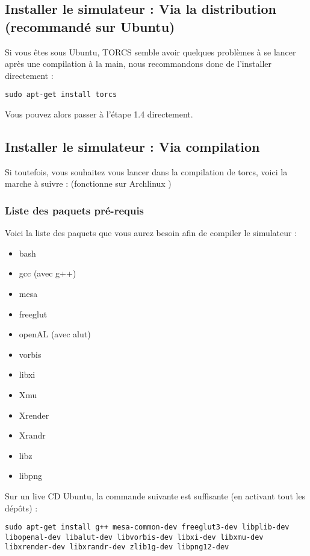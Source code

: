 \documentclass[a4paper,12pt]{article}
\begin{document}
  \subsection{Installer le simulateur : Via la distribution (recommandé sur Ubuntu) }
  
  Si vous êtes sous Ubuntu, TORCS semble avoir quelques problèmes à se lancer après une compilation à la main,
  nous recommandons donc de l'installer directement :
  
    \begin{lstlisting}
sudo apt-get install torcs
    \end{lstlisting}
    
    Vous pouvez alors passer à l'étape 1.4 directement.
   
  \subsection{Installer le simulateur : Via compilation}
  
  Si toutefois, vous souhaitez vous lancer dans la compilation de torcs, voici la marche à suivre : (fonctionne sur 
  Archlinux )
 
  \subsubsection{Liste des paquets pré-requis}
  Voici la liste des paquets que vous aurez besoin afin de compiler le simulateur :
  \begin{multicols}{2}
    \begin{itemize}
    \item bash
    \item gcc (avec g++)
    \item mesa
    \item freeglut
    \item openAL (avec alut)
    \item vorbis
    \item libxi
    \item Xmu
    \item Xrender
    \item Xrandr
    \item libz
    \item libpng
    \end{itemize}
  \end{multicols}
  
  Sur un live CD Ubuntu, la commande suivante est suffisante (en activant tout les dépôts) :
  \begin{lstlisting}
sudo apt-get install g++ mesa-common-dev freeglut3-dev libplib-dev libopenal-dev libalut-dev libvorbis-dev libxi-dev libxmu-dev libxrender-dev libxrandr-dev zlib1g-dev libpng12-dev 
    \end{lstlisting}
\end{document}
